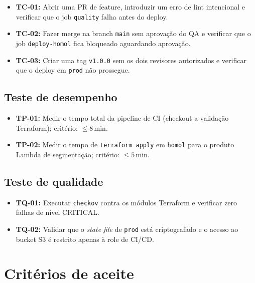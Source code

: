 \begin{itemize}[leftmargin=*]
  \item \textbf{TC-01:} Abrir uma PR de feature, introduzir um erro de
        lint intencional e verificar que o job \texttt{quality} falha
        antes do deploy.
  \item \textbf{TC-02:} Fazer merge na branch \texttt{main} sem
        aprova\c{c}\~ao do QA e verificar que o job \texttt{deploy-homol}
        fica bloqueado aguardando aprova\c{c}\~ao.
  \item \textbf{TC-03:} Criar uma tag \texttt{v1.0.0} sem os dois
        revisores autorizados e verificar que o deploy em \texttt{prod}
        n\~ao prossegue.
\end{itemize}

\subsection{Teste de desempenho}

\begin{itemize}[leftmargin=*]
  \item \textbf{TP-01:} Medir o tempo total da pipeline de CI (checkout
        a valida\c{c}\~ao Terraform); crit\'erio: $\leq 8$\,min.
  \item \textbf{TP-02:} Medir o tempo de \texttt{terraform apply} em
        \texttt{homol} para o produto Lambda de segmenta\c{c}\~ao;
        crit\'erio: $\leq 5$\,min.
\end{itemize}

\subsection{Teste de qualidade}

\begin{itemize}[leftmargin=*]
  \item \textbf{TQ-01:} Executar \texttt{checkov} contra os m\'odulos
        Terraform e verificar zero falhas de n\'ivel CRITICAL.
  \item \textbf{TQ-02:} Validar que o \textit{state file} de
        \texttt{prod} est\'a criptografado e o acesso ao bucket S3
        \'e restrito apenas \`a role de CI/CD.
\end{itemize}

\section{Crit\'erios de aceite}

